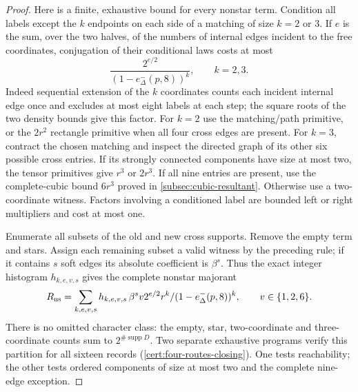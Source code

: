 \begin{proof}
Here is a finite, exhaustive bound for every nonstar term. Condition
all labels except the $k$ endpoints on each side of a matching
of size $k=2$ or $3$.
If $e$ is the sum, over the two halves, of the numbers of internal
edges incident to the free coordinates, conjugation of their
conditional laws costs at most
\[
 \frac{2^{e/2}}{(1-e^-_\Delta(p,8))^k},\qquad k=2,3.
\]
Indeed sequential extension of the $k$ coordinates counts each
incident internal edge once and excludes at most eight labels at
each step; the square roots of the two density bounds give this factor.
For $k=2$ use the matching/path primitive, or the $2r^2$ rectangle
primitive when all four cross edges are present. For $k=3$, contract
the chosen matching and inspect the directed graph of its other six
possible cross entries. If its strongly connected components have
size at most two, the tensor primitives give $r^3$ or $2r^3$.
If all nine entries are present, use the complete-cubic bound $6r^3$
proved in \cref{subsec:cubic-resultant}. Otherwise use a two-coordinate
witness. Factors involving a conditioned label are bounded left or
right multipliers and cost at most one.

Enumerate all subsets of the old and new cross supports. Remove the
empty term and stars. Assign each remaining subset a valid witness
by the preceding rule; if it contains $s$ soft edges its absolute
coefficient is $\beta^s$. Thus the exact integer histogram $h_{k,e,v,s}$
gives the complete nonstar majorant
\[
 R_{\rm ns}=\sum_{k,e,v,s}h_{k,e,v,s}\,
    \frac{\beta^s v2^{e/2}r^k}{(1-e^-_\Delta(p,8))^k},
 \qquad v\in\{1,2,6\}.
\]
There is no omitted character class: the empty, star, two-coordinate
and three-coordinate counts sum to $2^{\#\operatorname{supp}D}$.
Two separate exhaustive programs verify this partition for all sixteen
records (\cref{cert:four-routes-closing}). One tests reachability; the other tests ordered components
of size at most two and the complete nine-edge exception.


\end{proof}
